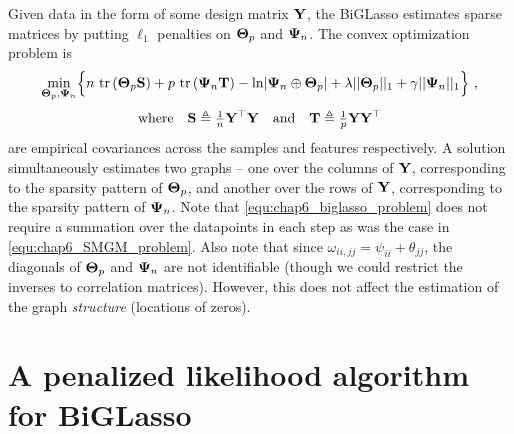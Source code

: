     Given data in the form of some design matrix $\mathbf{Y}$, the BiGLasso estimates sparse matrices by putting $\ell_1$ penalties on $\mathbf{\Theta}_p$ and $\mathbf{\Psi}_n$.
    The convex optimization problem is
    \begin{equation} \label{equ:chap6_biglasso_problem}
      \begin{split}
        \underset{\mathbf{\Theta}_p, \mathbf{\Psi}_n}{\textrm{min}} \Big\{  n~\textrm{tr} \left( \mathbf{\Theta}_p \mathbf{S} \right) + p~\textrm{tr} \left( \mathbf{\Psi}_n \mathbf{T} \right) - \ln \lvert \mathbf{\Psi}_n \oplus \mathbf{\Theta}_p \rvert + \lambda \vert\vert \mathbf{\Theta}_p \vert\vert_1 + \gamma \vert\vert \mathbf{\Psi}_n \vert\vert_1 \Big\}~,
      \end{split}
    \end{equation}
    \begin{equation}
      \label{equ:empiricalCovs} \textrm{where} \quad \mathbf{S} \triangleq \tfrac{1}{n}\mathbf{Y}^\top\mathbf{Y} \quad \textrm{and} \quad \mathbf{T} \triangleq \tfrac{1}{p}\mathbf{Y}\mathbf{Y}^\top
    \end{equation}
    are empirical covariances across the samples and features respectively.
    A solution simultaneously estimates two graphs -- one over the columns of $\mathbf{Y}$, corresponding to the sparsity pattern of $\mathbf{\Theta}_p$, and another over the rows of $\mathbf{Y}$, corresponding to the sparsity pattern of $\mathbf{\Psi}_n$.
    Note that \eqref{equ:chap6_biglasso_problem} does not require a summation over the datapoints in each step as was the case in \eqref{equ:chap6_SMGM_problem}.
    Also note that since $\omega_{ii,jj} = \psi_{ii} + \theta_{jj}$, the diagonals of $\mathbf{\Theta}_p$ and $\mathbf{\Psi}_n$ are not identifiable (though we could restrict the inverses to correlation matrices).
    However, this does not affect the estimation of the graph \emph{structure} (locations of zeros).

    
  
              
  \section{A penalized likelihood algorithm for BiGLasso} \label{sec:chap6_algorithm}

